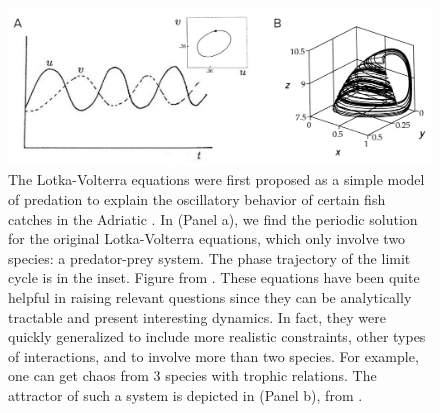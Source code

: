 \begin{figure}[t]
    \centering    
    \includegraphics[width=\columnwidth]{figures/methods/fig_LV.png}
    \caption[Historical example of Lotka-Volterra equations]{The Lotka-Volterra equations were first proposed as a simple model of predation to explain the oscillatory behavior of certain fish catches in the Adriatic \cite{murray2002mathematical}. In (Panel a), we find the periodic solution for the original Lotka-Volterra equations, which only involve two species: a predator-prey system. The phase trajectory of the limit cycle is in the inset. Figure from \cite{murray2002mathematical}. These equations have been quite helpful in raising relevant questions since they can be analytically tractable and present interesting dynamics. In fact, they were quickly generalized to include more realistic constraints, other types of interactions, and to involve more than two species. For example, one can get chaos from 3 species with trophic relations. The attractor of such a system is depicted in (Panel b), from \cite{hastings1991chaos}. }
    \label{fig:LV}
\end{figure}

